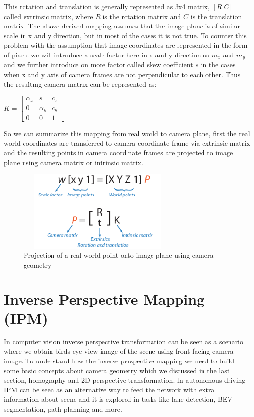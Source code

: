     This rotation and translation is generally represented as 3x4 matrix, $[R | C ]$ called extrinsic matrix, where $R$ is the rotation matrix and $C$ is the translation matrix. The above derived mapping assumes that the image plane is of similar scale in x and y direction, but in most of the cases it is not true. To counter this problem with the assumption that image coordinates are represented in the form of pixels we will introduce a scale factor here in x and y direction as $m_{x}$ and $m_{y}$ and we further introduce on more factor called skew coefficient $s$ in the cases when x and y axis of camera frames are not perpendicular to each other. Thus the resulting camera matrix can be represented as:
        \begin{center}
$K =  \begin{bmatrix} \alpha_{x} & s &c_{x} \\  0 & \alpha_{y} & c_{y}  \\  0  &0 &1 \end{bmatrix}$
    \end{center}
    
    So we can summarize this mapping from real world to camera plane, first the real world coordinates are transferred to camera coordinate frame via extrinsic matrix and the resulting points in camera coordinate frames are projected to image plane using camera matrix or intrinsic matrix. 
        \begin{figure}[h]
    \centering
    \includegraphics[width=8cm, height =4cm]{images/extrinsic_intrinsic.png}
    \caption{ Projection of a real world point onto image plane using camera geometry \cite{10.5555/861369}}
    \end{figure}
    
   
   
    \section{Inverse Perspective Mapping (IPM)}
     In computer vision inverse perspective transformation can be seen as a scenario where we obtain birds-eye-view image of the scene using front-facing camera image. To understand how the inverse perspective mapping we need to build some basic concepts about camera geometry which we discussed in the last section, homography and 2D perspective transformation. In autonomous driving IPM can be seen as an alternative way to feed the network with extra information about scene and it is explored in tasks like lane detection, BEV segmentation, path planning and more. 
     
